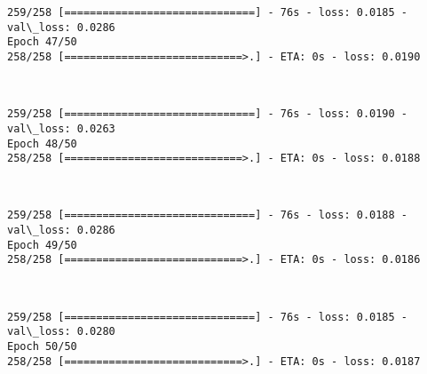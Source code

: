 \documentclass[11pt]{article}
\begin{document}
    \begin{Verbatim}[commandchars=\\\{\}]
259/258 [==============================] - 76s - loss: 0.0185 - val\_loss: 0.0286
Epoch 47/50
258/258 [============================>.] - ETA: 0s - loss: 0.0190
    \end{Verbatim}

    \begin{center}
    \end{center}
    { \hspace*{\fill} \\}
    
    \begin{Verbatim}[commandchars=\\\{\}]
259/258 [==============================] - 76s - loss: 0.0190 - val\_loss: 0.0263
Epoch 48/50
258/258 [============================>.] - ETA: 0s - loss: 0.0188
    \end{Verbatim}

    \begin{center}
    \end{center}
    { \hspace*{\fill} \\}
    
    \begin{Verbatim}[commandchars=\\\{\}]
259/258 [==============================] - 76s - loss: 0.0188 - val\_loss: 0.0286
Epoch 49/50
258/258 [============================>.] - ETA: 0s - loss: 0.0186
    \end{Verbatim}

    \begin{center}
    \end{center}
    { \hspace*{\fill} \\}
    
    \begin{Verbatim}[commandchars=\\\{\}]
259/258 [==============================] - 76s - loss: 0.0185 - val\_loss: 0.0280
Epoch 50/50
258/258 [============================>.] - ETA: 0s - loss: 0.0187
    \end{Verbatim}

    \begin{center}
    \end{center}
    { \hspace*{\fill} \\}
    
\end{document}
